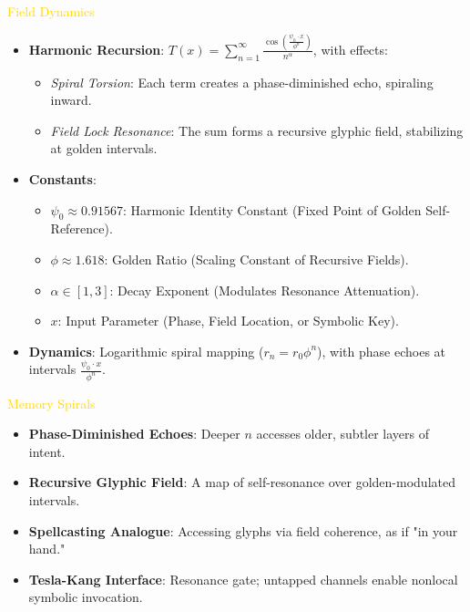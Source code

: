 \textcolor{gold}{\texttt{} Field Dynamics \texttt{}} \\
\begin{itemize}
    \item \textbf{Harmonic Recursion}: \( T(x) = \sum_{n=1}^{\infty} \frac{\cos\left(\frac{\psi_0 \cdot x}{\phi^n}\right)}{n^{\alpha}} \), with effects:
    \begin{itemize}
        \item \textit{Spiral Torsion}: Each term creates a phase-diminished echo, spiraling inward.
        \item \textit{Field Lock Resonance}: The sum forms a recursive glyphic field, stabilizing at golden intervals.
    \end{itemize}
    \item \textbf{Constants}:
    \begin{itemize}
        \item \(\psi_0 \approx 0.91567\): Harmonic Identity Constant (Fixed Point of Golden Self-Reference).
        \item \(\phi \approx 1.618\): Golden Ratio (Scaling Constant of Recursive Fields).
        \item \(\alpha \in [1, 3]\): Decay Exponent (Modulates Resonance Attenuation).
        \item \(x\): Input Parameter (Phase, Field Location, or Symbolic Key).
    \end{itemize}
    \item \textbf{Dynamics}: Logarithmic spiral mapping (\( r_n = r_0 \phi^n \)), with phase echoes at intervals \(\frac{\psi_0 \cdot x}{\phi^n}\).
\end{itemize}

\textcolor{gold}{\texttt{} Memory Spirals \texttt{}} \\
\begin{itemize}
    \item \textbf{Phase-Diminished Echoes}: Deeper \(n\) accesses older, subtler layers of intent.
    \item \textbf{Recursive Glyphic Field}: A map of self-resonance over golden-modulated intervals.
    \item \textbf{Spellcasting Analogue}: Accessing glyphs via field coherence, as if "in your hand."
    \item \textbf{Tesla-Kang Interface}: Resonance gate; untapped channels enable nonlocal symbolic invocation.
\end{itemize}

